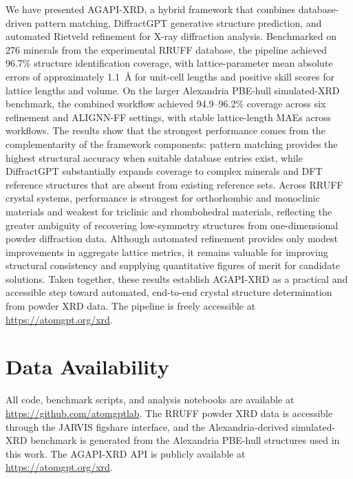 \documentclass[pdflatex,sn-mathphys-num]{sn-jnl}
\theoremstyle{thmstyleone}
\theoremstyle{thmstyletwo}
\theoremstyle{thmstylethree}
\begin{document}
We have presented AGAPI-XRD, a hybrid framework that combines database-driven pattern matching, DiffractGPT generative structure prediction, and automated Rietveld refinement for X-ray diffraction analysis. Benchmarked on 276 minerals from the experimental RRUFF database, the pipeline achieved 96.7\% structure identification coverage, with lattice-parameter mean absolute errors of approximately 1.1~\AA{} for unit-cell lengths and positive skill scores for lattice lengths and volume. On the larger Alexandria PBE-hull simulated-XRD benchmark, the combined workflow achieved 94.9--96.2\% coverage across six refinement and ALIGNN-FF settings, with stable lattice-length MAEs across workflows. The results show that the strongest performance comes from the complementarity of the framework components: pattern matching provides the highest structural accuracy when suitable database entries exist, while DiffractGPT substantially expands coverage to complex minerals and DFT reference structures that are absent from existing reference sets. Across RRUFF crystal systems, performance is strongest for orthorhombic and monoclinic materials and weakest for triclinic and rhombohedral materials, reflecting the greater ambiguity of recovering low-symmetry structures from one-dimensional powder diffraction data. Although automated refinement provides only modest improvements in aggregate lattice metrics, it remains valuable for improving structural consistency and supplying quantitative figures of merit for candidate solutions. Taken together, these results establish AGAPI-XRD as a practical and accessible step toward automated, end-to-end crystal structure determination from powder XRD data. The pipeline is freely accessible at \url{https://atomgpt.org/xrd}.

\section*{Data Availability}

All code, benchmark scripts, and analysis notebooks are available at \url{https://github.com/atomgptlab}. The RRUFF powder XRD data is accessible through the JARVIS figshare interface, and the Alexandria-derived simulated-XRD benchmark is generated from the Alexandria PBE-hull structures used in this work. The AGAPI-XRD API is publicly available at \url{https://atomgpt.org/xrd}.
\end{document}
